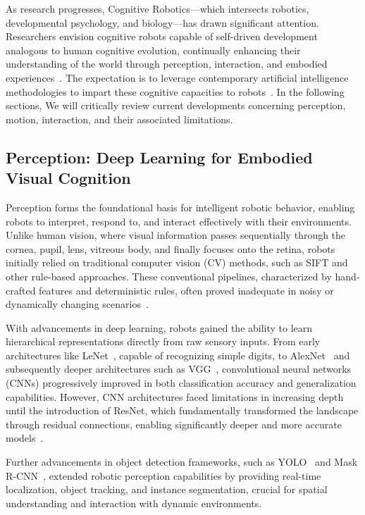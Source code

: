 \documentclass[conference]{IEEEtran}
\begin{document}
As research progresses, Cognitive Robotics—which intersects robotics, developmental psychology, and biology—has drawn significant attention. Researchers envision cognitive robots capable of self-driven development analogous to human cognitive evolution, continually enhancing their understanding of the world through perception, interaction, and embodied experiences~\cite{cangelosi2015developmental}. The expectation is to leverage contemporary artificial intelligence methodologies to impart these cognitive capacities to robots~\cite{brooks1991intelligence}. In the following sections, We will critically review current developments concerning perception, motion, interaction, and their associated limitations.

\subsection{Perception: Deep Learning for Embodied Visual Cognition}
Perception forms the foundational basis for intelligent robotic behavior, enabling robots to interpret, respond to, and interact effectively with their environments. Unlike human vision, where visual information passes sequentially through the cornea, pupil, lens, vitreous body, and finally focuses onto the retina, robots initially relied on traditional computer vision (CV) methods, such as SIFT and other rule-based approaches. These conventional pipelines, characterized by hand-crafted features and deterministic rules, often proved inadequate in noisy or dynamically changing scenarios~\cite{o2020deep}.

With advancements in deep learning, robots gained the ability to learn hierarchical representations directly from raw sensory inputs. From early architectures like LeNet~\cite{lecun1998gradient}, capable of recognizing simple digits, to AlexNet~\cite{krizhevsky2012imagenet} and subsequently deeper architectures such as VGG~\cite{simonyan2014very}, convolutional neural networks (CNNs) progressively improved in both classification accuracy and generalization capabilities. However, CNN architectures faced limitations in increasing depth until the introduction of ResNet, which fundamentally transformed the landscape through residual connections, enabling significantly deeper and more accurate models~\cite{he2016deep}.

Further advancements in object detection frameworks, such as YOLO~\cite{jiang2022review} and Mask R-CNN~\cite{bharati2020deep}, extended robotic perception capabilities by providing real-time localization, object tracking, and instance segmentation, crucial for spatial understanding and interaction with dynamic environments.
\end{document}
